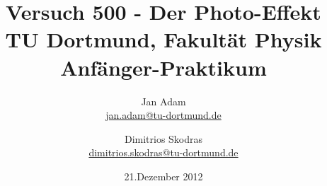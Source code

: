 



\title{Versuch 500 - Der Photo-Effekt\\				%
\large TU Dortmund, Fakultät Physik\\ 
\normalsize Anfänger-Praktikum}

\author{Jan Adam\\			%
{\small \href{jan.adam@tu-dortmund.de}{jan.adam@tu-dortmund.de}}	%
\and						%
Dimitrios Skodras\\					%
{\small \href{dimitrios.skodras@tu-dortmund.de}{dimitrios.skodras@tu-dortmund.de}}		%
}
\date{21.Dezember 2012}				%





\maketitle					%
\thispagestyle{empty} 				%



\tableofcontents


\newpage					%


